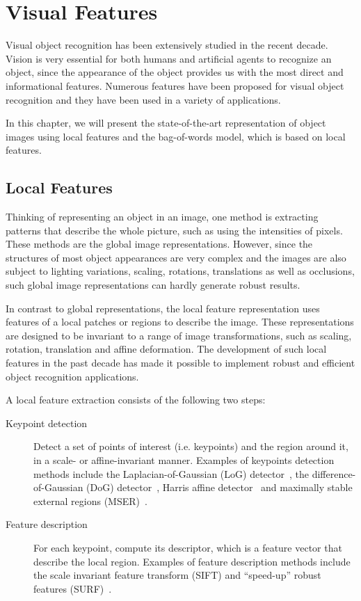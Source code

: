 \documentclass[12pt,final,twoside]{report}
\begin{document}
\cleardoublepage

\chapter{Visual Features}
\label{ch:visual}

Visual object recognition has been extensively studied in the recent decade. Vision is very essential for both humans and artificial agents to recognize an object, since the appearance of the object provides us with the most direct and informational features. Numerous features have been proposed for visual object recognition and they have been used in a variety of applications.

In this chapter, we will present the state-of-the-art representation of object images using local features and the bag-of-words model, which is based on local features.

\section{Local Features}
Thinking of representing an object in an image, one method is extracting patterns that describe the whole picture, such as using the intensities of pixels. These methods are the global image representations. However, since the structures of most object appearances are very complex and the images are also subject to lighting variations, scaling, rotations, translations as well as occlusions, such global image representations can hardly generate robust results. 

In contrast to global representations, the local feature representation uses features of a local patches or regions to describe the image. These representations are designed to be invariant to a range of image transformations, such as scaling, rotation, translation and affine deformation. The development of such local features in the past decade has made it possible to implement robust and efficient object recognition applications.

A local feature extraction consists of the following two steps: 
\begin{description}
  \item[Keypoint detection] Detect a set of points of interest (i.e. keypoints) and the region around it, in a scale- or affine-invariant manner. Examples of keypoints detection methods include the Laplacian-of-Gaussian (LoG) detector~\cite{lindeberg_feature_1998}, the difference-of-Gaussian (DoG) detector~\cite{lowe_object_1999}, Harris affine detector~\cite{mikolajczyk_scale_2004} and maximally stable external regions (MSER)~\cite{matas_robust_2004}. 
  \item[Feature description] For each keypoint, compute its descriptor, which is a feature vector that describe the local region. Examples of feature description methods include the scale invariant feature transform (SIFT) and ``speed-up'' robust features (SURF)~\cite{bay_speeded-up_2008}.
\end{description}
\end{document}
